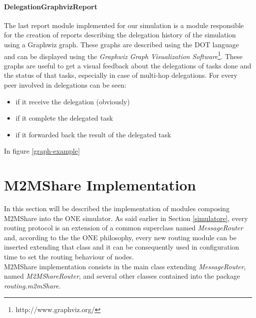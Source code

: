 \paragraph{DelegationGraphvizReport}
The last report module implemented for our simulation is a module responsible for the creation of reports describing the delegation history of the simulation using a Graphwiz graph. These graphs are described using the DOT language and can be displayed using the \textit{Graphwiz Graph Visualization Software}\footnote{http://www.graphviz.org/}. These graphs are useful to get a visual feedback about the delegations of tasks done and the status of that tasks, especially in case of multi-hop delegations. For every peer involved in delegations can be seen:
\begin{itemize}
\item if it receive the delegation (obviously)
\item if it complete the delegated task
\item if it forwarded back the result of the delegated task
\end{itemize}
In figure \ref{graph-example}


\section{M2MShare Implementation}
In this section will be described the implementation of modules composing M2MShare into the ONE simulator. As said earlier in Section \ref{simulatore}, every routing protocol is an extension of a common superclass named \textit{MessageRouter} and, according to the the ONE philosophy, every new routing module can be inserted extending that class and it can be consequently used in configuration time to set the routing behaviour of nodes.
\\

M2MShare implementation consists in the main class extending \textit{MessageRouter}, named \textit{M2MShareRouter}, and several other classes contained into the package \textit{routing.m2mShare}.

